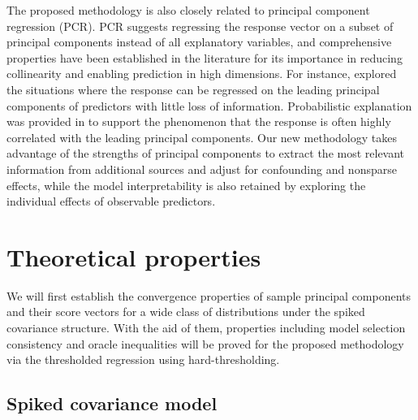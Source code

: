 \documentclass{statsoc}
\begin{document}

The proposed methodology is also closely related to principal component regression (PCR). PCR suggests regressing the response vector on a subset of principal components instead of all explanatory variables, and comprehensive properties have been established in the literature for its importance in reducing collinearity and enabling prediction in high dimensions. For instance, \cite{Cook2007} explored the situations where the response can be regressed on the leading principal components of predictors with little loss of information. Probabilistic explanation was provided in \cite{Li2009} to support the phenomenon that the response is often highly correlated with the leading principal components. Our new methodology takes advantage of the strengths of principal components to extract the most relevant information from additional sources and adjust for confounding and nonsparse effects, while the model interpretability is also retained by exploring the individual effects of observable predictors.



\section{Theoretical properties} \label{Sec4} %

We will first establish the convergence properties of sample principal components and their score vectors for a wide class of distributions under the spiked covariance structure. With the aid of them, properties including model selection consistency and oracle inequalities will be proved for the proposed methodology via the thresholded regression using hard-thresholding.


\subsection{Spiked covariance model} \label{Sec3nota}
\end{document}
